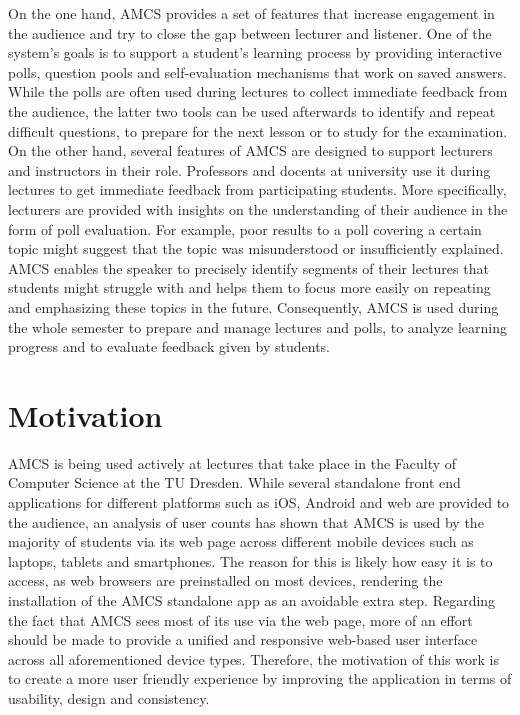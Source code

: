 On the one hand, AMCS provides a set of features that increase engagement in the audience and try to close the gap between lecturer and listener. One of the system's goals is to support a student's learning process by providing interactive polls, question pools and self-evaluation mechanisms that work on saved answers. While the polls are often used during lectures to collect immediate feedback from the audience, the latter two tools can be used afterwards to identify and repeat difficult questions, to prepare for the next lesson or to study for the examination.
\newline
\newline
On the other hand, several features of AMCS are designed to support lecturers and instructors in their role. Professors and docents at university use it during lectures to get immediate feedback from participating students. More specifically, lecturers are provided with insights on the understanding of their audience in the form of poll evaluation. For example, poor results to a poll covering a certain topic might suggest that the topic was misunderstood or insufficiently explained. AMCS enables the speaker to precisely identify segments of their lectures that students might struggle with and helps them to focus more easily on repeating and emphasizing these topics in the future. 
Consequently, AMCS is used during the whole semester to prepare and manage lectures and polls, to analyze learning progress and to evaluate feedback given by students.
\newline
\newline
\section{Motivation}
AMCS is being used actively at lectures that take place in the Faculty of Computer Science at the TU Dresden.
While several standalone front end applications for different platforms such as iOS, Android and web are provided to the audience, an analysis of user counts has shown that AMCS is used by the majority of students via its web page across different mobile devices such as laptops, tablets and smartphones.
The reason for this is likely how easy it is to access, as web browsers are preinstalled on most devices, rendering the installation of the AMCS standalone app as an avoidable extra step.
\newline
\newline 
Regarding the fact that AMCS sees most of its use via the web page, more of an effort should be made to provide a unified and responsive web-based user interface across all aforementioned device types.
\newline
\newline 
Therefore, the motivation of this work is to create a more user friendly experience by improving the application in terms of usability, design and consistency.

